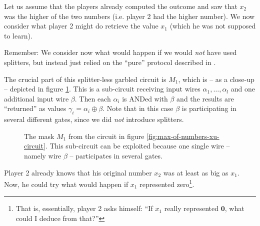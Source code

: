 Let us assume that the players already computed the outcome and saw that $x_2$ was the higher of the two numbers (i.e. player 2 had the higher number). We now consider what player 2 might do retrieve the value $x_1$ (which he was not supposed to learn).

Remember: We consider now what would happen if we would \emph{not} have used splitters, but instead just relied on the ``pure'' protocol described in \cite{Rogaway:1991:RCS:888502}.

The crucial part of this splitter-less garbled circuit is $M_1$, which is -- as a close-up -- depicted in figure \ref{fig:mask-m1}. This is a sub-circuit receiving input wires $\alpha_1,\dots,\alpha_l$ and one additional input wire $\beta$. Then each $\alpha_i$ is ANDed with $\beta$ and the results are ``returned'' as values $\gamma_i = \alpha_i \oplus \beta$. Note that in this case $\beta$ is participating in several different gates, since we did \emph{not} introduce splitters.

\begin{figure}[ht]
  \centering
  \caption{The mask $M_1$ from the circuit in figure \ref{fig:max-of-numbers-xu-circuit}. This sub-circuit can be exploited because one single wire -- namely wire $\beta$ -- participates in several gates. }
  \label{fig:mask-m1}
\end{figure}

Player 2 already knows that his original number $x_2$ was at least as big as $x_1$. Now, he could try what would happen if $x_1$ represented zero\footnote{That is, essentially, player 2 asks himself: ``If $x_1$ really represented $\mathbf{0}$, what could I deduce from that?''}. 

